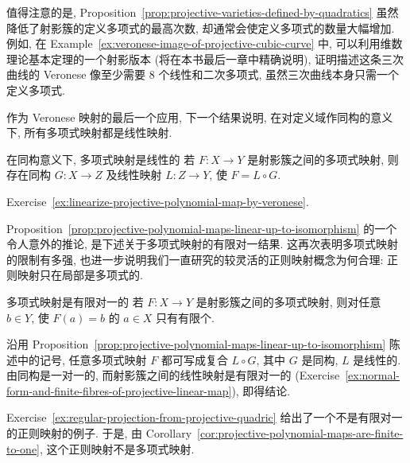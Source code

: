 值得注意的是, Proposition~\ref{prop:projective-varieties-defined-by-quadratics} 虽然降低了射影簇的定义多项式的最高次数, 却通常会使定义多项式的数量大幅增加. 例如, 在 Example~\ref{ex:veronese-image-of-projective-cubic-curve} 中, 可以利用维数理论基本定理的一个射影版本 (将在本书最后一章中精确说明), 证明描述这条三次曲线的 Veronese 像至少需要 8 个线性和二次多项式, 虽然三次曲线本身只需一个定义多项式.

作为 Veronese 映射的最后一个应用, 下一个结果说明, 在对定义域作同构的意义下, 所有多项式映射都是线性映射.

\begin{Proposition}{在同构意义下, 多项式映射是线性的}\leavevmode\label{prop:projective-polynomial-maps-linear-up-to-isomorphism}
若 $F:X\to Y$ 是射影簇之间的多项式映射, 则存在同构 $G:X\to Z$ 及线性映射 $L:Z\to Y$, 使 $F=L\circ G$.
\end{Proposition}
\begin{Proof}
Exercise~\ref{ex:linearize-projective-polynomial-map-by-veronese}.
\end{Proof}

Proposition~\ref{prop:projective-polynomial-maps-linear-up-to-isomorphism} 的一个令人意外的推论, 是下述关于多项式映射的有限对一结果. 这再次表明多项式映射的限制有多强, 也进一步说明我们一直研究的较灵活的正则映射概念为何合理: 正则映射只在局部是多项式的.

\begin{Corollary}{多项式映射是有限对一的}\leavevmode\label{cor:projective-polynomial-maps-are-finite-to-one}
若 $F:X\to Y$ 是射影簇之间的多项式映射, 则对任意 $b\in Y$, 使 $F(a)=b$ 的 $a\in X$ 只有有限个.
\end{Corollary}
\begin{Proof}
沿用 Proposition~\ref{prop:projective-polynomial-maps-linear-up-to-isomorphism} 陈述中的记号, 任意多项式映射 $F$ 都可写成复合 $L\circ G$, 其中 $G$ 是同构, $L$ 是线性的. 由同构是一对一的, 而射影簇之间的线性映射是有限对一的 (Exercise~\ref{ex:normal-form-and-finite-fibres-of-projective-linear-map}), 即得结论.
\end{Proof}

Exercise~\ref{ex:regular-projection-from-projective-quadric} 给出了一个不是有限对一的正则映射的例子. 于是, 由 Corollary~\ref{cor:projective-polynomial-maps-are-finite-to-one}, 这个正则映射不是多项式映射.

